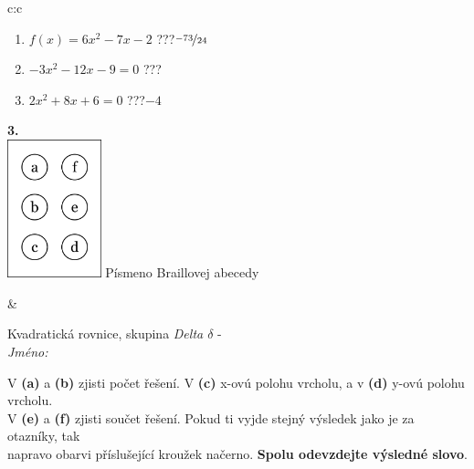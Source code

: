 \documentclass[10pt]{report}
\begin{document}
\begin{tabular}{c:c}
\begin{minipage}[c][104.5mm][t]{0.5\linewidth}
\begin{center}
\begin{minipage}{0.79\linewidth}
\begin{center}
\begin{varwidth}{\linewidth}
\begin{enumerate}
\item $f(x)=6x^2-7x-2$\quad \dotfill\; ???\;\dotfill \quad $\nicefrac{-73}{24}$
\item $-3x^2-12x-9=0$\quad \dotfill\; ???\;\dotfill {}
\item $2x^2+8x+6=0$\quad \dotfill\; ???\;\dotfill \quad $-4$
\end{enumerate}
\end{varwidth}
\end{center}
\end{minipage}
\begin{minipage}{0.20\linewidth}
\begin{center}
{\Huge\bfseries 3.} \\[2mm]
\includegraphics[height=40mm]{../images/braille.png}
{\small Písmeno Braillovej abecedy}
\end{center}
\end{minipage}
\end{center}
\end{minipage}
&
\begin{minipage}[c][104.5mm][t]{0.5\linewidth}
\begin{center}
\vspace{7mm}
{\huge Kvadratická rovnice, skupina \textit{Delta $\delta$} -}\\[5mm]
\textit{Jméno:}\phantom{xxxxxxxxxxxxxxxxxxxxxxxxxxxxxxxxxxxxxxxxxxxxxxxxxxxxxxxxxxxxxxxxx}\\[5mm]
\begin{minipage}{0.95\linewidth}
\begin{center}
V \textbf{(a)} a \textbf{(b)} zjisti počet řešení. V \textbf{(c)} x-ovú polohu vrcholu, a v \textbf{(d)} y-ovú polohu vrcholu.\\V \textbf{(e)} a \textbf{(f)} zjisti součet řešení. Pokud ti vyjde stejný výsledek jako je za otazníky, tak\\napravo obarvi příslušející kroužek načerno. \textbf{Spolu odevzdejte výsledné slovo}.
\end{center}
\end{minipage}
\\[1mm]

\end{center}
\end{minipage}
\end{tabular}
\end{document}
